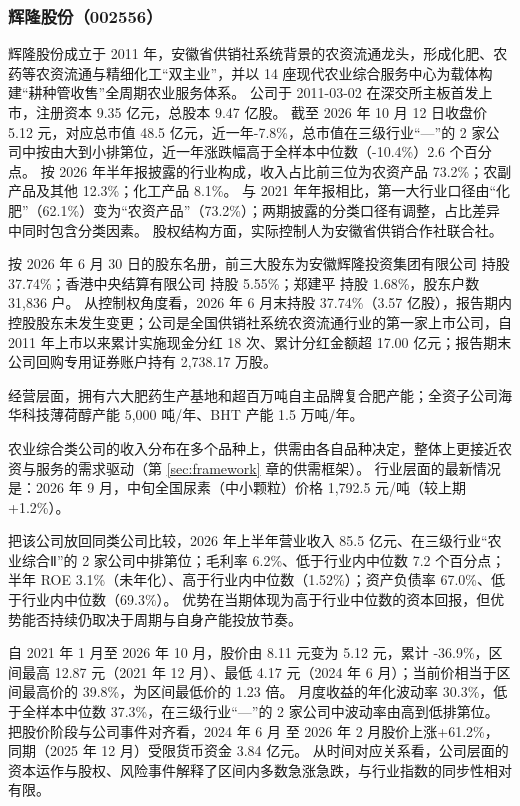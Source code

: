 
\subsubsection{辉隆股份（002556）}
\label{co:002556}

 辉隆股份成立于 2011 年，安徽省供销社系统背景的农资流通龙头，形成化肥、农药等农资流通与精细化工“双主业”，并以 14 座现代农业综合服务中心为载体构建“耕种管收售”全周期农业服务体系。 公司于 2011-03-02 在深交所主板首发上市，注册资本 9.35 亿元，总股本 9.47 亿股。 截至 2026 年 10 月 12 日收盘价 5.12 元，对应总市值 48.5 亿元，近一年-7.8\%，总市值在三级行业“—”的 2 家公司中按由大到小排第位，近一年涨跌幅高于全样本中位数（-10.4\%）2.6 个百分点。 按 2026 年半年报披露的行业构成，收入占比前三位为农资产品 73.2\%；农副产品及其他 12.3\%；化工产品 8.1\%。 与 2021 年年报相比，第一大行业口径由“化肥”（62.1\%）变为“农资产品”（73.2\%）；两期披露的分类口径有调整，占比差异中同时包含分类因素。 股权结构方面，实际控制人为安徽省供销合作社联合社。

 按 2026 年 6 月 30 日的股东名册，前三大股东为安徽辉隆投资集团有限公司 持股 37.74\%；香港中央结算有限公司 持股 5.55\%；郑建平 持股 1.68\%，股东户数 31,836 户。 从控制权角度看，2026 年 6 月末持股 37.74\%（3.57 亿股），报告期内控股股东未发生变更；公司是全国供销社系统农资流通行业的第一家上市公司，自 2011 年上市以来累计实施现金分红 18 次、累计分红金额超 17.00 亿元；报告期末公司回购专用证券账户持有 2,738.17 万股。

 经营层面，拥有六大肥药生产基地和超百万吨自主品牌复合肥产能；全资子公司海华科技薄荷醇产能 5,000 吨/年、BHT 产能 1.5 万吨/年。

 农业综合类公司的收入分布在多个品种上，供需由各自品种决定，整体上更接近农资与服务的需求驱动（第 \ref{sec:framework} 章的供需框架）。 行业层面的最新情况是：2026 年 9 月，中旬全国尿素（中小颗粒）价格 1,792.5 元/吨（较上期+1.2\%）。

 把该公司放回同类公司比较，2026 年上半年营业收入 85.5 亿元、在三级行业“农业综合Ⅱ”的 2 家公司中排第位；毛利率 6.2\%、低于行业内中位数 7.2 个百分点；半年 ROE 3.1\%（未年化）、高于行业内中位数（1.52\%）；资产负债率 67.0\%、低于行业内中位数（69.3\%）。 优势在当期体现为高于行业中位数的资本回报，但优势能否持续仍取决于周期与自身产能投放节奏。

 自 2021 年 1 月至 2026 年 10 月，股价由 8.11 元变为 5.12 元，累计 -36.9\%，区间最高 12.87 元（2021 年 12 月）、最低 4.17 元（2024 年 6 月）；当前价相当于区间最高价的 39.8\%，为区间最低价的 1.23 倍。 月度收益的年化波动率 30.3\%，低于全样本中位数 37.3\%，在三级行业“—”的 2 家公司中波动率由高到低排第位。 把股价阶段与公司事件对齐看，2024 年 6 月 至 2026 年 2 月股价上涨+61.2\%，同期（2025 年 12 月）受限货币资金 3.84 亿元。 从时间对应关系看，公司层面的资本运作与股权、风险事件解释了区间内多数急涨急跌，与行业指数的同步性相对有限。

